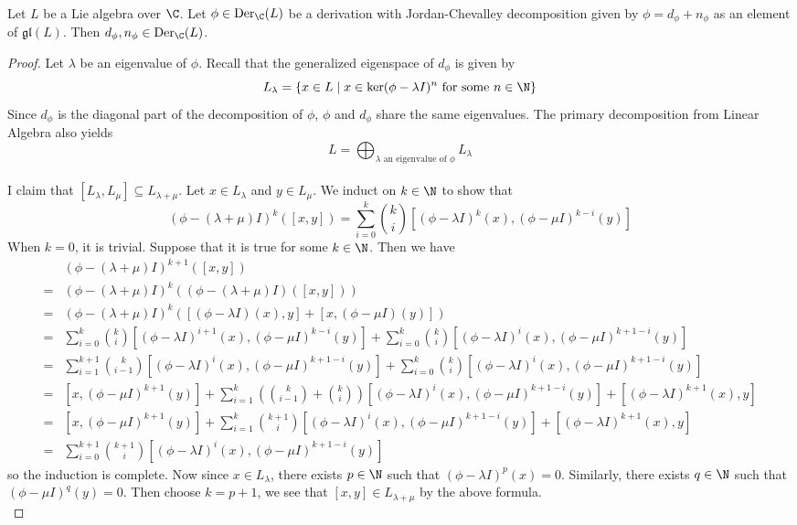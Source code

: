\documentclass[a4paper]{article}
\begin{document}
\begin{lmm}{}{} \\Let $L$ be a Lie algebra over $\C$. Let $\phi\in\text{Der}_\C(L)$ be a derivation with Jordan-Chevalley decomposition given by $\phi=d_\phi+n_\phi$ as an element of $\mathfrak{gl}(L)$. Then $d_\phi,n_\phi\in\text{Der}_\C(L)$. 
\begin{proof}
Let $\lambda$ be an eigenvalue of $\phi$. Recall that the generalized eigenspace of $d_\phi$ is given by $$L_\lambda=\{x\in L\;|\;x\in\ker(\phi-\lambda I)^n\text{ for some }n\in\N\}$$ Since $d_\phi$ is the diagonal part of the decomposition of $\phi$, $\phi$ and $d_\phi$ share the same eigenvalues. The primary decomposition from Linear Algebra also yields $$L=\bigoplus_{\lambda\text{ an eigenvalue of }\phi}L_\lambda$$~\\

I claim that $[L_\lambda,L_\mu]\subseteq L_{\lambda+\mu}$. Let $x\in L_\lambda$ and $y\in L_\mu$. We induct on $k\in\N$ to show that $$(\phi-(\lambda+\mu)I)^k([x,y])=\sum_{i=0}^k\binom{k}{i}\left[(\phi-\lambda I)^k(x),(\phi-\mu I)^{k-i}(y)\right]$$ When $k=0$, it is trivial. Suppose that it is true for some $k\in\N$. Then we have 
\begin{align*}
&(\phi-(\lambda+\mu)I)^{k+1}([x,y])\\
=&(\phi-(\lambda+\mu)I)^k((\phi-(\lambda+\mu)I)([x,y]))\\
=&(\phi-(\lambda+\mu)I)^k([(\phi-\lambda I)(x),y]+[x,(\phi-\mu I)(y)])\\
=&\sum_{i=0}^k\binom{k}{i}\left[(\phi-\lambda I)^{i+1}(x),(\phi-\mu I)^{k-i}(y)\right]+\sum_{i=0}^k\binom{k}{i}\left[(\phi-\lambda I)^i(x),(\phi-\mu I)^{k+1-i}(y)\right]\\
=&\sum_{i=1}^{k+1}\binom{k}{i-1}\left[(\phi-\lambda I)^i(x),(\phi-\mu I)^{k+1-i}(y)\right]+\sum_{i=0}^k\binom{k}{i}\left[(\phi-\lambda I)^i(x),(\phi-\mu I)^{k+1-i}(y)\right]\\
=&\left[x,(\phi-\mu I)^{k+1}(y)\right]+\sum_{i=1}^k\left(\binom{k}{i-1}+\binom{k}{i}\right)\left[(\phi-\lambda I)^i(x),(\phi-\mu I)^{k+1-i}(y)\right]+\left[(\phi-\lambda I)^{k+1}(x),y\right]\\
=&\left[x,(\phi-\mu I)^{k+1}(y)\right]+\sum_{i=1}^k\binom{k+1}{i}\left[(\phi-\lambda I)^i(x),(\phi-\mu I)^{k+1-i}(y)\right]+\left[(\phi-\lambda I)^{k+1}(x),y\right]\\
=&\sum_{i=0}^{k+1}\binom{k+1}{i}\left[(\phi-\lambda I)^i(x),(\phi-\mu I)^{k+1-i}(y)\right]
\end{align*}
so the induction is complete. Now since $x\in L_\lambda$, there exists $p\in\N$ such that $(\phi-\lambda I)^p(x)=0$. Similarly, there exists $q\in\N$ such that $(\phi-\mu I)^q(y)=0$. Then choose $k=p+1$, we see that $[x,y]\in L_{\lambda+\mu}$ by the above formula. \\


\end{proof}
\end{lmm}
\end{document}
